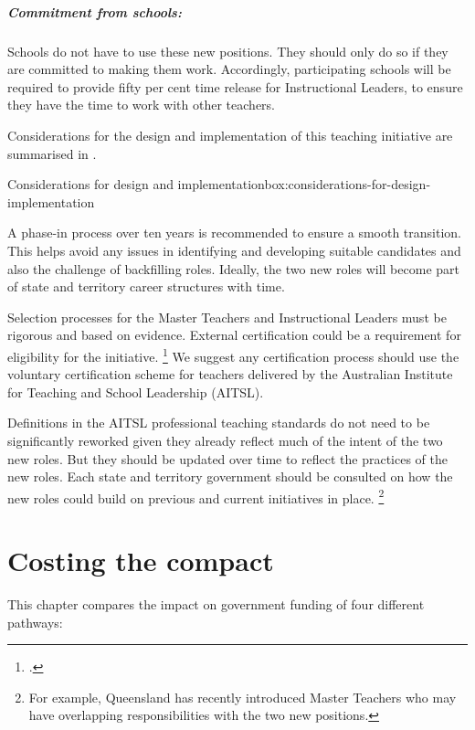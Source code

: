 \documentclass{grattan}
\begin{document}
\paragraph{Commitment from schools:} Schools do not have to use these new positions. They should only do so if they are committed to making them work. Accordingly, participating schools will be required to provide fifty per cent time release for Instructional Leaders, to ensure they have the time to work with other teachers.

Considerations for the design and implementation of this teaching initiative are summarised in .


\begin{smallbox}{Considerations for design and implementation}{box:considerations-for-design-implementation}

A phase-in process over ten years is recommended to ensure a smooth transition.
This helps avoid any issues in identifying and developing suitable candidates and also the challenge of backfilling roles.
Ideally, the two new roles will become part of state and territory career structures with time.

Selection processes for the Master Teachers and Instructional Leaders must be rigorous and based on evidence.
External certification could be a requirement for eligibility for the initiative.%
\footcite{Dinham2008TeachingTalentBest}
  We suggest any certification process should use the voluntary certification scheme for teachers delivered by the Australian Institute for Teaching and School Leadership (AITSL).

Definitions in the AITSL professional teaching standards do not need to be significantly reworked given they already reflect much of the intent of the two new roles. But they should be updated over time to reflect the practices of the new roles. Each state and territory government should be consulted on how the new roles could build on previous and current initiatives in place.%
\footnote{For example, Queensland has recently introduced Master Teachers who may have overlapping responsibilities with the two new positions.}
\end{smallbox}

\chapter{Costing the compact}\label{chap:costing-the-compact}


This chapter compares the impact on government funding of four different pathways:
\end{document}
